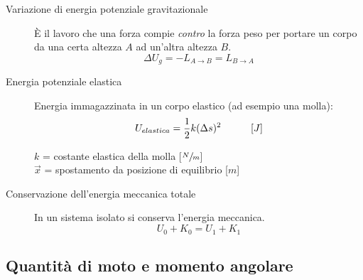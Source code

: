 \documentclass[a4paper,11pt,italian]{article}
\begin{document}
\begin{description}
  \item[Variazione di energia potenziale gravitazionale] 
  È il lavoro che una forza compie \emph{contro} la forza peso per portare un corpo da una certa altezza $ A $ ad un'altra altezza $ B $.
  \[ \Delta U_g = -L_{A\rightarrow B} = L_{B\rightarrow A} \]
  
  \item[Energia potenziale elastica] 
  Energia immagazzinata in un corpo elastico (ad esempio una molla):
  \[ U_{elastica} = \frac{1}{2} k (\Delta s)^2 \hspace*{3em} [J] \]
  \begin{multicols}{2}
  $ k $ = costante elastica della molla [$ \sfrac{N}{m} $]\\
  $ \vec{x} $ = spostamento da posizione di equilibrio [$ m $]
  \end{multicols}
  
  \item[Conservazione dell'energia meccanica totale] 
  In un sistema isolato si conserva l'energia meccanica. 
  \[ U_0 + K_0 = U_1 + K_1 \]
\end{description}



\subsection{Quantità di moto e momento angolare}
\end{document}
